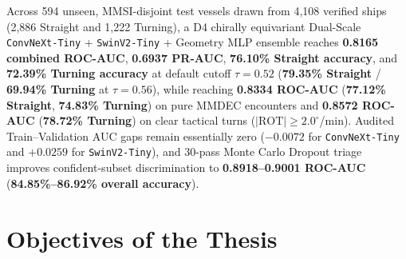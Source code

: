 \documentclass[11pt,a4paper]{article}
\begin{document}
Across 594 unseen, MMSI-disjoint test vessels drawn from 4,108 verified ships (2,886 Straight and 1,222 Turning), a D4 chirally equivariant Dual-Scale \texttt{ConvNeXt-Tiny} + \texttt{SwinV2-Tiny} + Geometry MLP ensemble reaches \textbf{0.8165 combined ROC-AUC}, \textbf{0.6937 PR-AUC}, \textbf{76.10\% Straight accuracy}, and \textbf{72.39\% Turning accuracy} at default cutoff $\tau=0.52$ (\textbf{79.35\% Straight} / \textbf{69.94\% Turning} at $\tau=0.56$), while reaching \textbf{0.8334 ROC-AUC} (\textbf{77.12\% Straight}, \textbf{74.83\% Turning}) on pure MMDEC encounters and \textbf{0.8572 ROC-AUC} (\textbf{78.72\% Turning}) on clear tactical turns ($|\text{ROT}|\ge 2.0^\circ$/min). Audited Train--Validation AUC gaps remain essentially zero ($-0.0072$ for \texttt{ConvNeXt-Tiny} and $+0.0259$ for \texttt{SwinV2-Tiny}), and 30-pass Monte Carlo Dropout triage improves confident-subset discrimination to \textbf{0.8918--0.9001 ROC-AUC} (\textbf{84.85\%--86.92\% overall accuracy}).

\section{Objectives of the Thesis}
\end{document}
